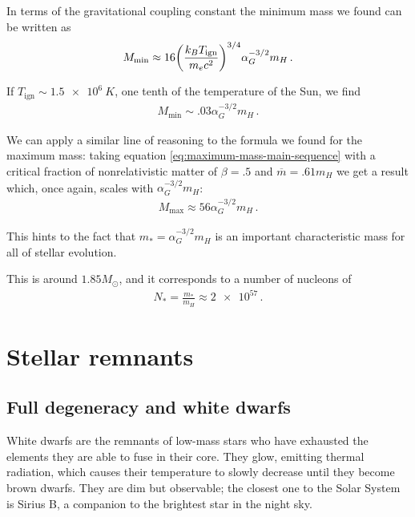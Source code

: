 \documentclass[main.tex]{subfiles}
\begin{document}
In terms of the gravitational coupling constant the minimum mass we found can be written as 
%
\begin{align}
  M _{\text{min}} \approx
  16 \qty(\frac{k_B T _{\text{ign}}}{m_e c^2})^{3/4}
  \alpha_{G}^{-3/2} m_H
\,.
\end{align}

If \(T _{\text{ign}} \sim \SI{1.5e6}{K}\), one tenth of the temperature of the Sun, we find 
%
\begin{align}
  M _{\text{min}} \sim \num{.03} \alpha_{G}^{-3/2} m_H
\,.
\end{align}

We can apply a similar line of reasoning to the formula we found for the maximum mass: taking equation \eqref{eq:maximum-mass-main-sequence}  with a critical fraction of nonrelativistic matter of \(\beta = \num{.5}\) and \(\overline{m} = \num{.61} m_H\) we get a result which, once again, scales with \(\alpha _G^{-3/2} m_H\):
%
\begin{align}
  M _{\text{max}} \approx 56 \alpha_{G}^{-3/2} m_H
\,.
\end{align}

This hints to the fact that \(m_{*} = \alpha_{G}^{-3/2} m_H \) is an important characteristic mass for all of stellar evolution.

This is around \(\num{1.85} M_{\odot}\), and it corresponds to a number of nucleons of
%
\begin{align}
  N_{*} = \frac{m_{*}}{m_H} \approx \num{2e57}
\,.
\end{align}

\section{Stellar remnants}

\subsection{Full degeneracy and white dwarfs}

White dwarfs are the remnants of low-mass stars who have exhausted the elements they are able to fuse in their core. They glow, emitting thermal radiation, which causes their temperature to slowly decrease until they become brown dwarfs. 
They are dim but observable; the closest one to the Solar System is Sirius B, a companion to the brightest star in the night sky.
\end{document}
